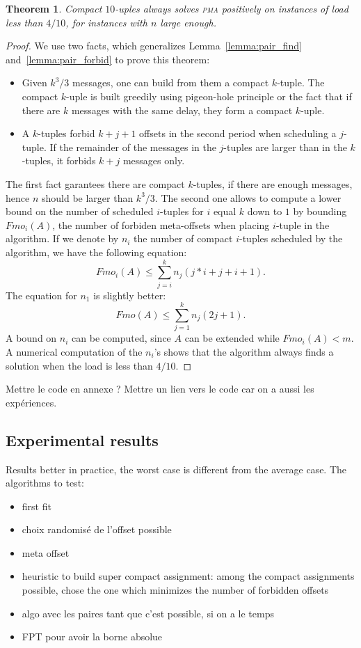 \documentclass[10pt, conference, letterpaper]{IEEEtran}
\newtheorem{theorem}{Theorem}
\newcommand\pma{\textsc{pma}\xspace}
\begin{document}
\begin{theorem}
Compact $10$-uples always solves \pma positively on instances of load less than $4/10$, for instances with $n$ large enough.
\end{theorem}
\begin{proof}
We use two facts, which generalizes Lemma~\ref{lemma:pair_find} and~\ref{lemma:pair_forbid} to prove this theorem:
\begin{itemize}
\item Given $ k^3/3$ messages, one can build from them a compact $k$-tuple. 
The compact $k$-uple is built greedily using pigeon-hole principle or the fact that if there are $k$ messages with the same delay, they form a compact $k$-uple.
\item A $k$-tuples forbid $k+j+1$ offsets in the second period when scheduling a 
$j$-tuple. If the remainder of the messages in the $j$-tuples are larger than in the $k$-tuples, it forbids $k+j$ messages only.
\end{itemize}

The first fact garantees there are compact $k$-tuples, if there are enough messages,
hence $n$ should be larger than $k^3/3$.
The second one allows to compute a lower bound on the number of scheduled $i$-tuples for $i$ equal $k$ down to $1$ by bounding $Fmo_i(A)$, the number of forbiden meta-offsets when placing $i$-tuple in the algorithm.
If we denote by $n_i$ the number of compact $i$-tuples scheduled by the algorithm,
we have the following equation:  $$ Fmo_i(A) \leq \displaystyle{\sum_{j=i}^k n_j(j*i + j + i+ 1)}.$$
The equation for $n_1$ is slightly better: 
$$ Fmo(A) \leq \displaystyle{\sum_{j=1}^k n_j(2j + 1)}.$$
A bound on $n_i$ can be computed, since $A$ can be extended while $Fmo_i(A) < m$. A numerical computation of the $n_i$'s shows that the algorithm always finds a solution when the load is less than $4/10$.
\end{proof}

Mettre le code en annexe ? Mettre un lien vers le code car on a aussi les expériences.

\subsection{Experimental results}

Results better in practice, the worst case is different from the 
average case.
The algorithms to test:
\begin{itemize}
	\item first fit
	\item choix randomisé de l'offset possible
	\item meta offset
	\item heuristic to build super compact assignment: among the compact assignments
possible, chose the one which minimizes the number of forbidden offsets
	\item algo avec les paires tant que c'est possible, si on a le temps
	\item FPT pour avoir la borne absolue
\end{itemize}
\end{document}
